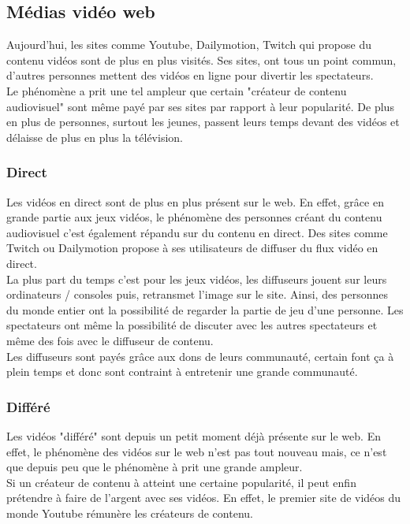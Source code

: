 \documentclass[11pt]{report} %
\begin{document}
		\subsection{Médias vidéo web}
		 Aujourd'hui, les sites comme Youtube, Dailymotion, Twitch qui propose du contenu vidéos sont de plus en plus visités. Ses sites, ont tous un point commun, d'autres personnes mettent des vidéos en ligne pour divertir les spectateurs. \\
		 Le phénomène a prit une tel ampleur que certain "créateur de contenu audiovisuel" sont même payé par ses sites par rapport à leur popularité. De plus en plus de personnes, surtout les jeunes, passent leurs temps devant des vidéos et délaisse de plus en plus la télévision.
			\subsubsection{Direct}
			Les vidéos en direct sont de plus en plus présent sur le web. En effet, grâce en grande partie aux jeux vidéos, le phénomène des personnes créant du contenu audiovisuel c'est également répandu sur du contenu en direct. Des sites comme Twitch ou Dailymotion propose à ses utilisateurs de diffuser du flux vidéo en direct. \\ 
			La plus part du temps c'est pour les jeux vidéos, les diffuseurs jouent sur leurs ordinateurs / consoles puis, retransmet l'image sur le site. Ainsi, des personnes du monde entier ont la possibilité de regarder la partie de jeu d'une personne. Les spectateurs ont même la possibilité de discuter avec les autres spectateurs et même des fois avec le diffuseur de contenu.\\
			Les diffuseurs sont payés grâce aux dons de leurs communauté, certain font ça à plein temps et donc sont contraint à entretenir une grande communauté.
			\subsubsection{Différé}
			Les vidéos "différé" sont depuis un petit moment déjà présente sur le web. En effet, le phénomène des vidéos sur le web n'est pas tout nouveau mais, ce n'est que depuis peu que le phénomène à prit une grande ampleur. \\
			Si un créateur de contenu à atteint une certaine popularité, il peut enfin prétendre à faire de l'argent avec ses vidéos. En effet, le premier site de vidéos du monde Youtube rémunère les créateurs de contenu.
\end{document}
